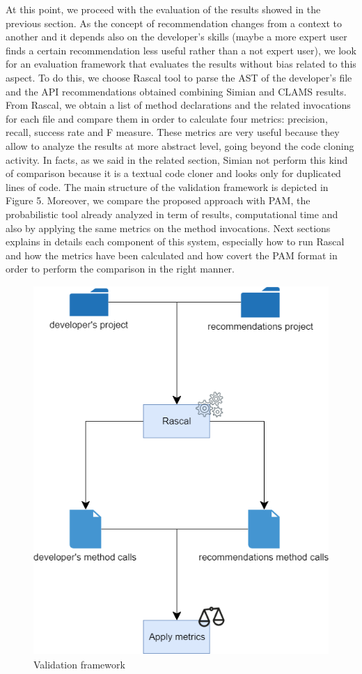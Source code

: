 At this point, we proceed with the evaluation of the results showed in the previous section. As the concept of recommendation changes from a context to another and it depends also on the developer's skills (maybe a more expert user finds a certain recommendation less useful rather than a not expert user), we look for an evaluation framework that evaluates the results without bias related to this aspect. To do this, we choose Rascal tool to parse the AST of the developer's file and the API recommendations obtained combining Simian and CLAMS results. From Rascal, we obtain a list of method declarations and the related invocations for each file and compare them in order to calculate four metrics: precision, recall, success rate and F measure. These metrics are very useful because they allow to analyze the results at more abstract level, going beyond the code cloning activity. In facts, as we said in the related section, Simian not perform this kind of comparison because it is a textual code cloner and looks only for duplicated lines of code. The main structure of the validation framework is depicted in Figure 5. Moreover, we compare the proposed approach with PAM, the probabilistic tool already analyzed in term of results, computational time and also by applying the same metrics on the method invocations. Next sections explains in details each component of this system, especially how to run Rascal and how the metrics have been calculated and how covert the PAM format in order to perform the comparison in the right manner.




\begin{figure}[H]
\includegraphics[width=14cm,height=14cm,keepaspectratio]{images/rascal.png}
\centering
 \caption{Validation framework}
 \label{fig:cmd}
\end{figure}

